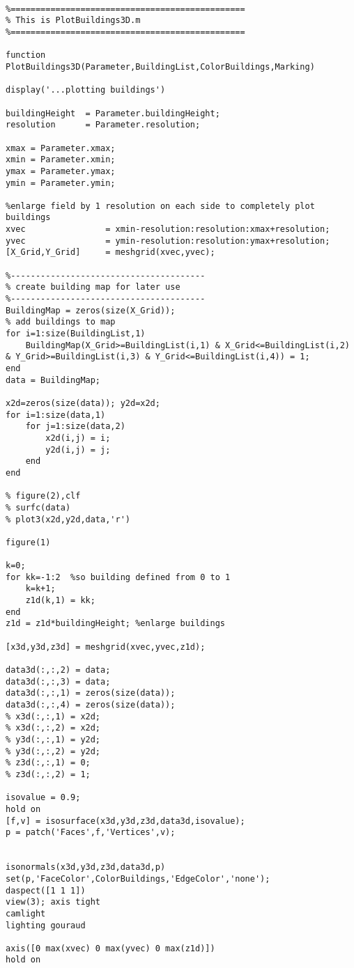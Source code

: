 \lstset{basicstyle=\footnotesize\ttfamily}
    
\begin{lstlisting}[breaklines]

%===============================================
% This is PlotBuildings3D.m
%===============================================

function PlotBuildings3D(Parameter,BuildingList,ColorBuildings,Marking)

display('...plotting buildings')

buildingHeight  = Parameter.buildingHeight;
resolution      = Parameter.resolution;

xmax = Parameter.xmax;
xmin = Parameter.xmin;
ymax = Parameter.ymax;
ymin = Parameter.ymin;

%enlarge field by 1 resolution on each side to completely plot buildings
xvec                = xmin-resolution:resolution:xmax+resolution;
yvec                = ymin-resolution:resolution:ymax+resolution;
[X_Grid,Y_Grid]     = meshgrid(xvec,yvec);

%---------------------------------------
% create building map for later use
%---------------------------------------
BuildingMap = zeros(size(X_Grid));
% add buildings to map
for i=1:size(BuildingList,1)
    BuildingMap(X_Grid>=BuildingList(i,1) & X_Grid<=BuildingList(i,2) & Y_Grid>=BuildingList(i,3) & Y_Grid<=BuildingList(i,4)) = 1;
end
data = BuildingMap;

x2d=zeros(size(data)); y2d=x2d;
for i=1:size(data,1)
    for j=1:size(data,2)
        x2d(i,j) = i;
        y2d(i,j) = j;
    end
end

% figure(2),clf
% surfc(data)
% plot3(x2d,y2d,data,'r')

figure(1)

k=0;
for kk=-1:2  %so building defined from 0 to 1
    k=k+1;
    z1d(k,1) = kk;
end
z1d = z1d*buildingHeight; %enlarge buildings
    
[x3d,y3d,z3d] = meshgrid(xvec,yvec,z1d);

data3d(:,:,2) = data;
data3d(:,:,3) = data;
data3d(:,:,1) = zeros(size(data));
data3d(:,:,4) = zeros(size(data));
% x3d(:,:,1) = x2d;
% x3d(:,:,2) = x2d;
% y3d(:,:,1) = y2d;
% y3d(:,:,2) = y2d;
% z3d(:,:,1) = 0;
% z3d(:,:,2) = 1;

isovalue = 0.9;
hold on
[f,v] = isosurface(x3d,y3d,z3d,data3d,isovalue);
p = patch('Faces',f,'Vertices',v);


isonormals(x3d,y3d,z3d,data3d,p)
set(p,'FaceColor',ColorBuildings,'EdgeColor','none');
daspect([1 1 1])
view(3); axis tight
camlight 
lighting gouraud

axis([0 max(xvec) 0 max(yvec) 0 max(z1d)])
hold on

\end{lstlisting}